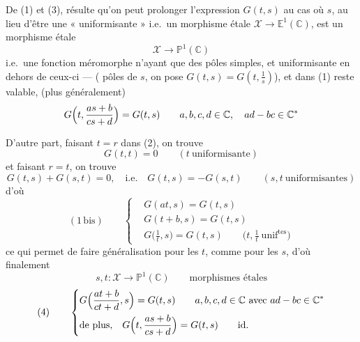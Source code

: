 \documentclass[11pt,a4paper]{article}
\begin{document}
De (1) et (3), résulte qu'on peut prolonger l'expression $G(t,s)$ au cas où $s$, au lieu d'être une « uniformisante » i.e.\ un morphisme étale $\mathcal{X}\to\mathbb{E}^1(\mathbb{C})$, est un morphisme étale
\[
\mathcal{X}\to\mathbb{P}^1(\mathbb{C})
\]
i.e.\ une fonction méromorphe n'ayant que des pôles simples, et uniformisante en dehors de ceux-ci — (  pôles de $s$, on pose $G(t,s)=G(t,\frac1s)$), et dans  (1)  reste valable,  (plus généralement)
\[
G\Bigl(t,\frac{as+b}{cs+d}\Bigr)=G(t,s)\qquad a,b,c,d\in\mathbb{C},\quad ad-bc\in\mathbb{C}^*
\]

D'autre part, faisant $t=r$ dans (2), on trouve
\[
G(t,t)=0\qquad(t\ \text{uniformisante})
\]
et faisant $r=t$, on trouve
\[
G(t,s)+G(s,t)=0,\quad\text{i.e.}\quad G(t,s)=-G(s,t)\qquad(s,t\ \text{uniformisantes})
\]
d'où
\[
(1\,\text{bis})\qquad
\left\{
\begin{aligned}
&G(at,s)=G(t,s)\\
&G(t+b,s)=G(t,s)\\
&G\bigl(\tfrac1t,s\bigr)=G(t,s)\qquad\bigl(t,\tfrac1t\ \text{unif}^{\text{tes}}\bigr)
\end{aligned}
\right.
\]
ce qui permet de faire  généralisation pour les $t$, comme pour les $s$, d'où finalement
\[
s,t:\mathcal{X}\to\mathbb{P}^1(\mathbb{C})\qquad\text{morphismes étales}
\]
\[
(4)\qquad
\left\{
\begin{aligned}
&G\Bigl(\frac{at+b}{ct+d},s\Bigr)=G(t,s)\qquad a,b,c,d\in\mathbb{C}\ \text{avec}\ ad-bc\in\mathbb{C}^*\\
&\text{de plus,}\quad G\Bigl(t,\frac{as+b}{cs+d}\Bigr)=G(t,s)\qquad\text{id.}
\end{aligned}
\right.
\]
\end{document}
